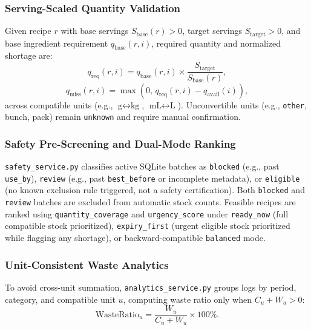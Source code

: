\subsubsection{Serving-Scaled Quantity Validation}
Given recipe $r$ with base servings $S_{\text{base}}(r) > 0$, target servings $S_{\text{target}} > 0$, and base ingredient requirement $q_{\text{base}}(r, i)$, required quantity and normalized shortage are:
\begin{equation}
q_{\text{req}}(r, i) = q_{\text{base}}(r, i) \times \frac{S_{\text{target}}}{S_{\text{base}}(r)},
\end{equation}
\begin{equation}
q_{\text{miss}}(r, i) = \max\!\left(0,\, q_{\text{req}}(r, i) - q_{\text{avail}}(i)\right),
\end{equation}
across compatible units (e.g., $\text{g} \leftrightarrow \text{kg}$, $\text{mL} \leftrightarrow \text{L}$). Unconvertible units (e.g., \texttt{other}, bunch, pack) remain \texttt{unknown} and require manual confirmation.

\subsubsection{Safety Pre-Screening and Dual-Mode Ranking}
\texttt{safety\_service.py} classifies active SQLite batches as \texttt{blocked} (e.g., past \texttt{use\_by}), \texttt{review} (e.g., past \texttt{best\_before} or incomplete metadata), or \texttt{eligible} (no known exclusion rule triggered, not a safety certification). Both \texttt{blocked} and \texttt{review} batches are excluded from automatic stock counts. Feasible recipes are ranked using \texttt{quantity\_\allowbreak coverage} and \texttt{urgency\_score} under \texttt{ready\_now} (full compatible stock prioritized), \texttt{expiry\_first} (urgent eligible stock prioritized while flagging any shortage), or backward-compatible \texttt{balanced} mode.

\subsubsection{Unit-Consistent Waste Analytics}
To avoid cross-unit summation, \texttt{analytics\_service.py} groups logs by period, category, and compatible unit $u$, computing waste ratio only when $C_u + W_u > 0$:
\begin{equation}
\text{WasteRatio}_u = \frac{W_u}{C_u + W_u} \times 100\%.
\end{equation}

